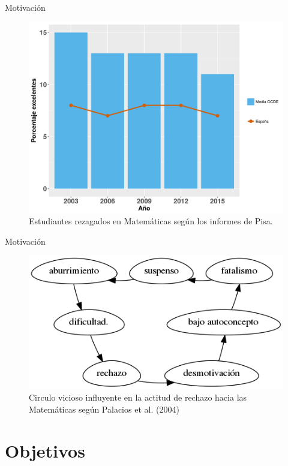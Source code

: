 \documentclass[10pt,notes,compress,usetitleprogressbar,aspectratio=1610]{beamer}
\begin{document}
\begin{frame}{Motivación}
	\note{}
	\begin{figure}
		\includegraphics[scale=0.4]{../img/PisaExcelentes.png}
		\caption{Estudiantes rezagados en Matemáticas según los informes de Pisa.}
	\end{figure}
\end{frame}



\begin{frame}{Motivación}
	\note{}
	\begin{figure}
		\includegraphics[scale=0.4]{../img/circuloVicioso.png}
		\caption{Circulo vicioso influyente en la actitud de rechazo hacia las Matemáticas según Palacios et al. (2004)}
	\end{figure}
\end{frame}




\section{Objetivos}
\end{document}

